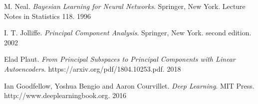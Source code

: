 \documentclass[11pt,a4paper]{article}
\theoremstyle{definition}
\numberwithin{equation}{section}
\begin{document}
\begin{thebibliography}{10}
M. Neal.
\textit{Bayesian Learning for Neural Networks}. 
Springer, New York. Lecture Notes in Statistics 118. 1996

I. T. Jolliffe.
\textit{Principal Component Analysis}. 
Springer, New York. second edition. 2002

Elad Plaut.
\textit{From Principal Subspaces to Principal Components with Linear Autoencoders}. 
https://arxiv.org/pdf/1804.10253.pdf. 2018

Ian Goodfellow, Yoshua Bengio and Aaron Courvillet.
\textit{Deep Learning}. 
MIT Press. http://www.deeplearningbook.org. 2016
%
%
%
%
%
\end{thebibliography}
%
\end{document}
